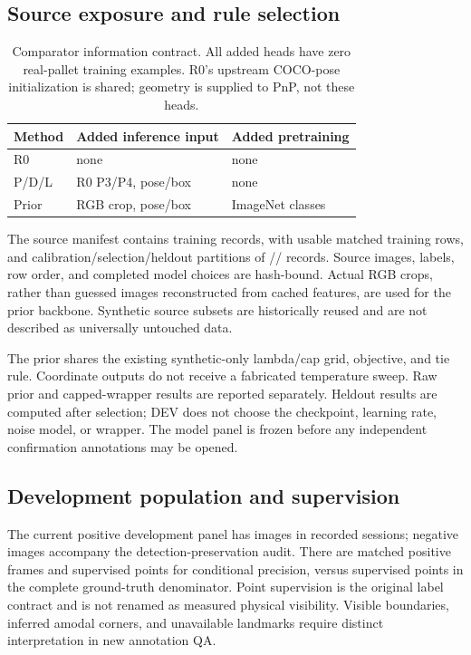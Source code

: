 \documentclass[journal]{IEEEtran}
\begin{document}
\subsection{Source exposure and rule selection}
\begin{table}[t]\centering\caption{Comparator information contract. All added heads have zero real-pallet training examples. R0's upstream COCO-pose initialization is shared; geometry is supplied to PnP, not these heads.}\label{tab:inputs}
\small\begin{tabular}{lll}\toprule Method & Added inference input & Added pretraining\\\midrule
R0 & none & none\\
P/D/L & R0 P3/P4, pose/box & none\\
Prior & RGB crop, pose/box & ImageNet classes\\\bottomrule\end{tabular}\end{table}
The source manifest contains \TrainN{} training records, with \UsableTrainN{} usable matched training rows, and calibration/selection/heldout partitions of \CalN{}/\SelectionN{}/\HeldoutN{} records. Source images, labels, row order, and completed model choices are hash-bound. Actual RGB crops, rather than guessed images reconstructed from cached features, are used for the prior backbone. Synthetic source subsets are historically reused and are not described as universally untouched data.

The prior shares the existing synthetic-only lambda/cap grid, objective, and tie rule. Coordinate outputs do not receive a fabricated temperature sweep. Raw prior and capped-wrapper results are reported separately. Heldout results are computed after selection; DEV does not choose the checkpoint, learning rate, noise model, or wrapper. The model panel is frozen before any independent confirmation annotations may be opened.

\subsection{Development population and supervision}
The current positive development panel has \DevN{} images in \SessionN{} recorded sessions; \NegN{} negative images accompany the detection-preservation audit. There are \MatchedN{} matched positive frames and \MatchedPoints{} supervised points for conditional precision, versus \AllPoints{} supervised points in the complete ground-truth denominator. Point supervision is the original label contract and is not renamed as measured physical visibility. Visible boundaries, inferred amodal corners, and unavailable landmarks require distinct interpretation in new annotation QA.
\end{document}
